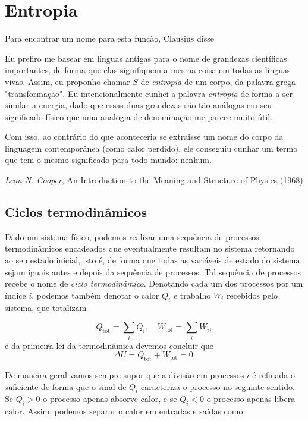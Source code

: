 \documentclass[a4paper, 12pt]{article}
\theoremstyle{definition}
\theoremstyle{definition}
\begin{document}
\section{Entropia}

\epigraph{\justifying Para encontrar um nome para esta função, Clausius disse

\begin{displayquote}
    Eu prefiro me basear em línguas antigas para o nome de grandezas científicas importantes, de forma
    que elas signifiquem a mesma coisa em todas as línguas vivas. Assim, eu proponho chamar $S$ de \textit{entropia}
    de um corpo, da palavra grega "transformação". Eu intencionalmente cunhei a palavra \textit{entropia} de forma 
    a ser similar a energia, dado que essas duas grandezas são tão análogas em seu significado físico que uma analogia 
    de denominação me parece muito útil.
\end{displayquote}

Com isso, ao contrário do que aconteceria se extraisse um nome do corpo da linguagem contemporânea (como calor
perdido), ele conseguiu cunhar um termo que tem o mesmo significado para todo mundo: nenhum.}{\textit{Leon N. Cooper}, 
An Introduction to the Meaning and Structure of Physics (1968)}

\subsection{Ciclos termodinâmicos}

Dado um sistema físico, podemos realizar uma sequência de processos termodinâmicos encadeados que
eventualmente resultam no sistema retornando ao seu estado inicial, isto é, de forma que todas as variáveis
de estado do sistema sejam iguais antes e depois da sequência de processos. Tal sequência de processos
recebe o nome de \textit{ciclo termodinâmico}. Denotando cada um dos processos por um índice $i$, podemos
também denotar o calor $Q_i$ e trabalho $W_i$ recebidos pelo sistema, que totalizam

$$Q_\text{tot}=\sum_iQ_i,\quad W_\text{tot}=\sum_iW_i,$$
e da primeira lei da termodinâmica devemos concluir que
$$\Delta U=Q_\text{tot}+W_\text{tot}=0.$$

De maneira geral vamos sempre supor que a divisão em processos $i$ é refinada o suficiente de forma que
o sinal de $Q_i$ caracteriza o processo no seguinte sentido. Se $Q_i>0$ o processo apenas absorve calor, 
e se $Q_i<0$ o processo apenas libera calor. Assim, podemos separar o calor em entradas e saídas como
\end{document}
